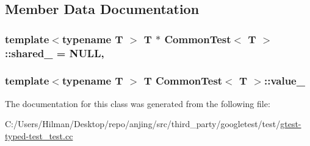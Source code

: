 \subsection{Member Data Documentation}
\hypertarget{class_common_test_a52368ce1e65a865db9bdccbcc2cedaac}{}
\subsubsection[{shared\+\_\+}]{\setlength{\rightskip}{0pt plus 5cm}template$<$typename T $>$ T $\ast$ {\bf Common\+Test}$<$ T $>$\+::shared\+\_\+ = N\+U\+L\+L\hspace{0.3cm}{\ttfamily [static]}, {\ttfamily [protected]}}\label{class_common_test_a52368ce1e65a865db9bdccbcc2cedaac}
\hypertarget{class_common_test_ae59c4abcb833625a7baeb2048531ebec}{}
\subsubsection[{value\+\_\+}]{\setlength{\rightskip}{0pt plus 5cm}template$<$typename T $>$ T {\bf Common\+Test}$<$ T $>$\+::value\+\_\+\hspace{0.3cm}{\ttfamily [protected]}}\label{class_common_test_ae59c4abcb833625a7baeb2048531ebec}


The documentation for this class was generated from the following file\+:\begin{DoxyCompactItemize}
\item 
C\+:/\+Users/\+Hilman/\+Desktop/repo/anjing/src/third\+\_\+party/googletest/test/\hyperlink{gtest-typed-test__test_8cc}{gtest-\/typed-\/test\+\_\+test.\+cc}\end{DoxyCompactItemize}

